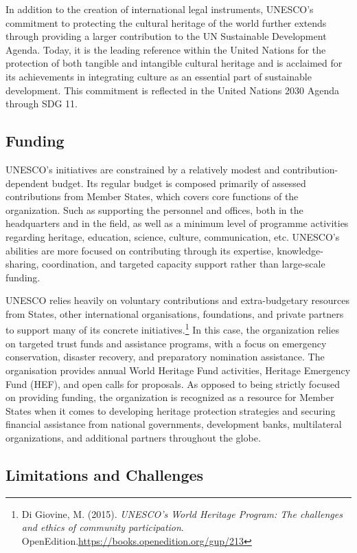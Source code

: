 In addition to the creation of international legal instruments, UNESCO’s commitment to protecting the cultural heritage of the world further extends through providing a larger contribution to the UN Sustainable Development Agenda. Today, it is the leading reference within the United Nations for the protection of both tangible and intangible cultural heritage and is acclaimed for its achievements in integrating culture as an essential part of sustainable development. This commitment is reflected in the United Nations 2030 Agenda through SDG 11.

\subsection{Funding}

UNESCO’s initiatives are constrained by a relatively modest and contribution-dependent budget. Its regular budget is composed primarily of assessed contributions from Member States, which covers core functions of the organization. Such as supporting the personnel and offices, both in the headquarters and in the field, as well as a minimum level of programme activities regarding heritage, education, science, culture, communication, etc. UNESCO’s abilities are more focused on contributing through its expertise, knowledge-sharing, coordination, and targeted capacity support rather than large-scale funding.

UNESCO relies heavily on voluntary contributions and extra-budgetary resources from States, other international organisations, foundations, and private partners to support many of its concrete initiatives.\footnote{Di Giovine, M. (2015). \emph{UNESCO's World Heritage Program: The challenges and ethics of community participation}. OpenEdition.\url{https://books.openedition.org/gup/213}} In this case, the organization relies on targeted trust funds and assistance programs, with a focus on emergency conservation, disaster recovery, and preparatory nomination assistance. The organisation provides annual World Heritage Fund activities, Heritage Emergency Fund (HEF), and open calls for proposals. As opposed to being strictly focused on providing funding, the organization is recognized as a resource for Member States when it comes to developing heritage protection strategies and securing financial assistance from national governments, development banks, multilateral organizations, and additional partners throughout the globe.

\subsection{Limitations and Challenges}

